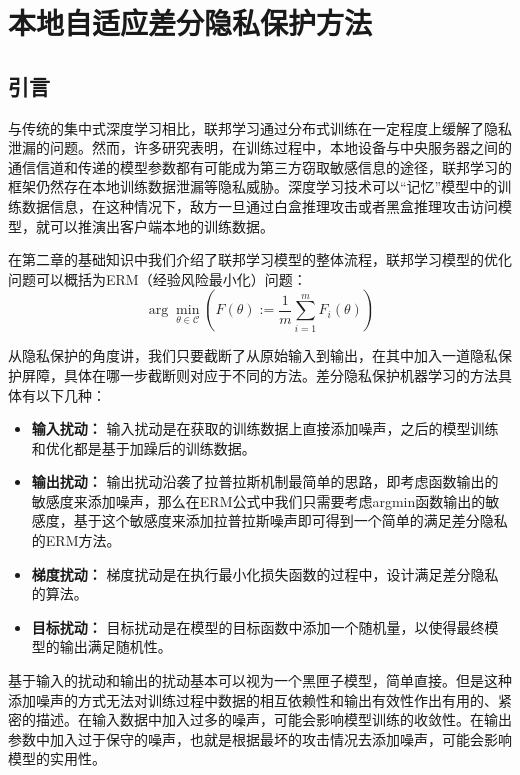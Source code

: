 \chapter{本地自适应差分隐私保护方法}

\label{ch3}

\section{引言}
与传统的集中式深度学习相比，联邦学习通过分布式训练在一定程度上缓解了隐私泄漏的问题。然而，许多研究表明，在训练过程中，本地设备与中央服务器之间的通信信道和传递的模型参数都有可能成为第三方窃取敏感信息的途径，联邦学习的框架仍然存在本地训练数据泄漏等隐私威胁。深度学习技术可以“记忆”模型中的训练数据信息，在这种情况下，敌方一旦通过白盒推理攻击或者黑盒推理攻击访问模型，就可以推演出客户端本地的训练数据。

在第二章的基础知识中我们介绍了联邦学习模型的整体流程，联邦学习模型的优化问题可以概括为ERM（经验风险最小化）问题：
\begin{equation}\label{eq:ERM}
\arg \min _{\theta \in \mathcal{C}}\left(F(\theta):=\frac{1}{m} \sum_{i=1}^{m} F_{i}(\theta)\right)
\end{equation}

从隐私保护的角度讲，我们只要截断了从原始输入到输出，在其中加入一道隐私保护屏障，具体在哪一步截断则对应于不同的方法。差分隐私保护机器学习的方法具体有以下几种：
\begin{itemize}
	\item \textbf{输入扰动：} 输入扰动是在获取的训练数据上直接添加噪声，之后的模型训练和优化都是基于加躁后的训练数据。
	\item \textbf{输出扰动：} 输出扰动沿袭了拉普拉斯机制最简单的思路，即考虑函数输出的敏感度来添加噪声，那么在ERM公式中我们只需要考虑argmin函数输出的敏感度，基于这个敏感度来添加拉普拉斯噪声即可得到一个简单的满足差分隐私的ERM方法。
	\item \textbf{梯度扰动：} 梯度扰动是在执行最小化损失函数的过程中，设计满足差分隐私的算法。
	\item \textbf{目标扰动：} 目标扰动是在模型的目标函数中添加一个随机量，以使得最终模型的输出满足随机性。
\end{itemize}

基于输入的扰动和输出的扰动基本可以视为一个黑匣子模型，简单直接。但是这种添加噪声的方式无法对训练过程中数据的相互依赖性和输出有效性作出有用的、紧密的描述。在输入数据中加入过多的噪声，可能会影响模型训练的收敛性。在输出参数中加入过于保守的噪声，也就是根据最坏的攻击情况去添加噪声，可能会影响模型的实用性。

